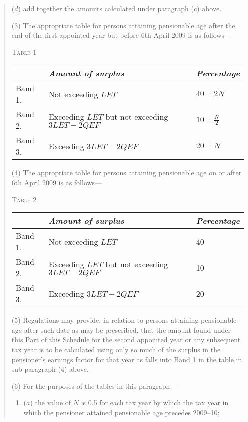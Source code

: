 \documentclass[12pt,a4paper]{article}
\begin{document}
\begin{quotation}
\begin{enumerate}
($d$) add together the amounts calculated under paragraph ($c$)  above.
\end{enumerate}

(3) The appropriate table for persons attaining pensionable age after the end of the first appointed year but before 6th April 2009 is as follows—

\medskip

\noindent\textsc{Table 1}

{\noindent\footnotesize
\begin{tabulary}{\linewidth}{JJJ}
\hline
&\itshape Amount of surplus	&\itshape Percentage\\
\hline
Band 1. 	&Not exceeding $LET$	&$40 + 2N$\\
Band 2. 	&Exceeding $LET$ but not exceeding $3LET - 2QEF$	&$10 + \frac{N}{2}$\\
Band 3. 	&Exceeding $3LET - 2QEF$	&$20 + N$\\
\hline
\end{tabulary}

}

\medskip

(4) The appropriate table for persons attaining pensionable age on or after 6th April 2009 is as follows—

\medskip

\noindent\textsc{Table 2}

{\noindent\footnotesize
\begin{tabulary}{\linewidth}{JJJ}
\hline
&\itshape Amount of surplus	&\itshape Percentage\\
\hline
Band 1. 	&Not exceeding $LET$	&40\\
Band 2. 	&Exceeding $LET$ but not exceeding $3LET - 2QEF$	&10\\
Band 3. 	&Exceeding $3LET - 2QEF$	&20\\
\hline
\end{tabulary}

}

\medskip

(5) Regulations may provide, in relation to persons attaining pensionable age after such date as may be prescribed, that the amount found under this Part of this Schedule for the second appointed year or any subsequent tax year is to be calculated using only so much of the surplus in the pensioner’s earnings factor for that year as falls into Band 1 in the table in sub-paragraph (4)  above.

(6) For the purposes of the tables in this paragraph—
\begin{enumerate}\item[]
($a$) the value of $N$ is 0.5 for each tax year by which the tax year in which the pensioner attained pensionable age precedes 2009--10;


\end{enumerate}
\end{quotation}
\end{document}
